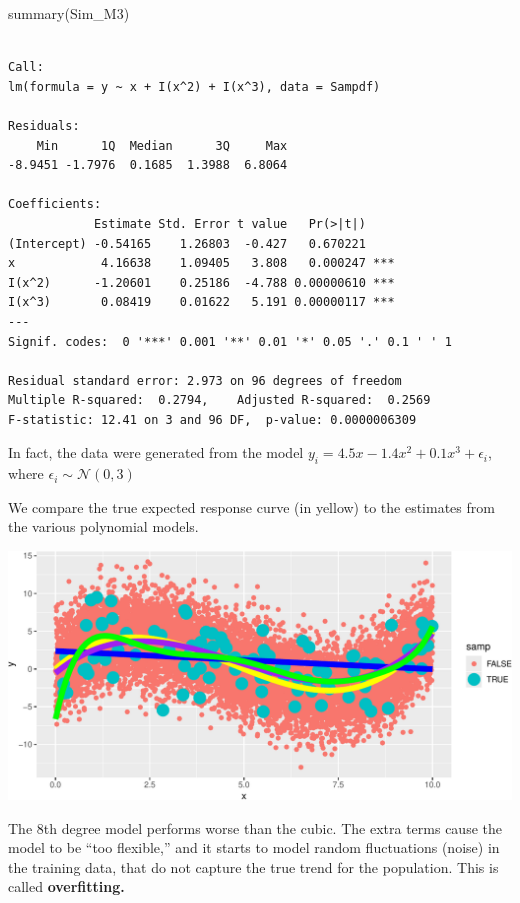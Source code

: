 \documentclass[
  letterpaper,
  DIV=11,
  numbers=noendperiod]{scrreprt}
\newenvironment{Shaded}{\begin{snugshade}}{\end{snugshade}}
\newcommand{\FunctionTok}[1]{\textcolor[rgb]{0.28,0.35,0.67}{#1}}
\newcommand{\NormalTok}[1]{\textcolor[rgb]{0.00,0.23,0.31}{#1}}
\begin{document}
\begin{Shaded}
\begin{Highlighting}[]
\FunctionTok{summary}\NormalTok{(Sim\_M3)}
\end{Highlighting}
\end{Shaded}

\begin{verbatim}

Call:
lm(formula = y ~ x + I(x^2) + I(x^3), data = Sampdf)

Residuals:
    Min      1Q  Median      3Q     Max 
-8.9451 -1.7976  0.1685  1.3988  6.8064 

Coefficients:
            Estimate Std. Error t value   Pr(>|t|)    
(Intercept) -0.54165    1.26803  -0.427   0.670221    
x            4.16638    1.09405   3.808   0.000247 ***
I(x^2)      -1.20601    0.25186  -4.788 0.00000610 ***
I(x^3)       0.08419    0.01622   5.191 0.00000117 ***
---
Signif. codes:  0 '***' 0.001 '**' 0.01 '*' 0.05 '.' 0.1 ' ' 1

Residual standard error: 2.973 on 96 degrees of freedom
Multiple R-squared:  0.2794,    Adjusted R-squared:  0.2569 
F-statistic: 12.41 on 3 and 96 DF,  p-value: 0.0000006309
\end{verbatim}

In fact, the data were generated from the model
\(y_i = 4.5x  - 1.4x^2 +  0.1x^3 + \epsilon_i\), where
\(\epsilon_i\sim\mathcal{N}(0,3)\)

We compare the true expected response curve (in yellow) to the estimates
from the various polynomial models.

\includegraphics{Ch7_files/figure-pdf/unnamed-chunk-23-1.pdf}

The 8th degree model performs worse than the cubic. The extra terms
cause the model to be ``too flexible,'' and it starts to model random
fluctuations (noise) in the training data, that do not capture the true
trend for the population. This is called \textbf{overfitting.}
\end{document}
